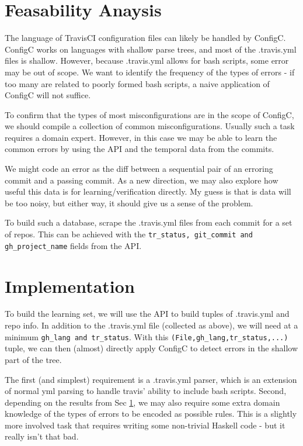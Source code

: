 \documentclass{sigplanconf}
\begin{document}
\section{Feasability Anaysis}
\label{sec:feas}

The language of TravisCI configuration files can likely be handled by ConfigC.
ConfigC works on languages with shallow parse trees, and most of the .travis.yml files is shallow.
However, because .travis.yml allows for bash scripts, some error may be out of scope.
We want to identify the frequency of the types of errors - if too many are related to poorly formed bash scripts, a naive application of ConfigC will not suffice.

To confirm that the types of most misconfigurations are in the scope of ConfigC, we should compile a collection of common misconfigurations. 
Usually such a task requires a domain expert.
However, in this case we may be able to learn the common errors by using the API and the temporal data from the commits.

We might code an error as the diff between a sequential pair of an erroring commit and a passing commit. 
As a new direction, we may also explore how useful this data is for learning/verification directly.
My guess is that is data will be too noisy, but either way, it should give us a sense of the problem.

To build such a database, scrape the .travis.yml files from each commit for a set of repos.
This can be achieved with the \verb|tr_status, git_commit and gh_project_name| fields from the API.

\section{Implementation}

To build the learning set, we will use the API to build tuples of .travis.yml and repo info. 
In addition to the .travis.yml file (collected as above), we will need at a minimum \verb|gh_lang and tr_status|. 
With this \verb|(File,gh_lang,tr_status,...)| tuple, we can then (almost) directly apply ConfigC to detect errors in the shallow part of the tree.

The first (and simplest) requirement is a .travis.yml parser, which is an extension of normal yml parsing to handle travis' ability to include bash scripts.
Second, depending on the results from Sec \ref{sec:feas}, we may also require some extra domain knowledge of the types of errors to be encoded as possible rules.
This is a slightly more involved task that requires writing some non-trivial Haskell code - but it really isn't that bad.






\end{document}
